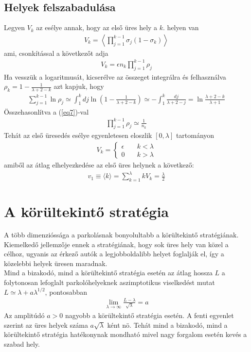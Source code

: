 \documentclass{article}
\begin{document}
	\subsection{Helyek felszabadulása}
	Legyen $V_k$ az esélye annak, hogy az első üres hely a $k$. helyen van  
	\begin{align}
		V_k=\left\langle\prod_{j=1}^{k-1}\sigma_j(1-\sigma_k)\right\rangle
	\end{align}
	ami, csonkítással a következőt adja
	\begin{align}
		V_k=\epsilon n_k\prod_{j=1}^{k-1}\rho_j
	\end{align}
	Ha vesszük a logaritmusát, kicserélve az összeget integrálra és felhasználva $\rho_k=1-\frac{1}{\lambda+2-k}$ azt kapjuk, hogy 
	\begin{align}
		\sum_{j=1}^{k-1}\ln\rho_j\simeq\int_{1}^{k}dj\ln\left(1-\frac{1}{\lambda+2-k}\right)\simeq-\int_{1}^{k}\frac{dj}{\lambda+2-j}=\ln\frac{\lambda+2-k}{\lambda+1}
	\end{align}
	Összehasonlítva a (\ref{eq7})-val
	\begin{align}
		\prod_{j=1}^{k-1}\rho_j \simeq \frac{1}{n_k}
	\end{align}
	Tehát az első üresedés esélye egyenletesen eloszlik $[0,\lambda]$ tartományon
	\begin{align}
		V_k=
		\begin{cases}
			\epsilon &\quad k < \lambda \\
			0 &\quad k > \lambda
		\end{cases}
	\end{align}
	amiből az átlag elhelyezkedése az első üres helynek a következő:
	\begin{align}
		v_1 \equiv \langle k \rangle = \sum_{k=1}^{\lambda}kV_k=\frac{\lambda}{2}
	\end{align}
	\section{A körültekintő stratégia}
	A több dimenzióssága
	a parkolásnak bonyolultabb a körültekintő stratégiának. Kiemelkedő jellemzője ennek a stratégiának, hogy sok üres hely van közel a célhoz, ugyanis az érkező autók a legjobboldalibb helyet foglalják el, így a közelebbi helyek üresen maradnak.\\
	Mind a bizakodó, mind a körültekintő stratégia esetén az átlag hossza $L$ a folytonosan lefoglalt parkolóhelyeknek aszimptotikus viselkedést mutat $L \simeq\lambda+a\lambda^{1/2}$, pontosabban
	\begin{align}
		\lim\limits_{\lambda \to \infty}\frac{L-\lambda}{\sqrt{\lambda}}=a
	\end{align}
	Az amplitúdó $a>0$ nagyobb a körültekintő stratégia esetén. A fenti egyenlet szerint az üres helyek száma $a\sqrt{\lambda}$ ként nö. Tehát mind a bizakodó, mind a körültekintő stratégia hatékonynak mondható mivel nagy forgalom esetén kevés a szabad hely.
\end{document}
